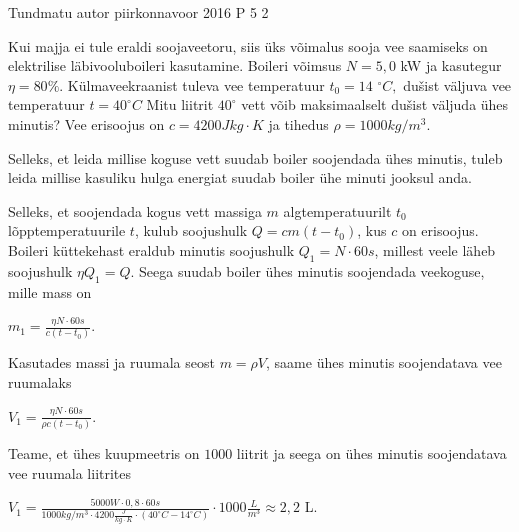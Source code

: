 {Tundmatu autor} %
{piirkonnavoor} %
{2016} %
{P 5} %
{2} %
{

\ifStatement
Kui majja ei tule eraldi soojaveetoru, siis üks võimalus sooja vee saamiseks on elektrilise läbivooluboileri kasutamine. Boileri võimsus $N = 5,0$ kW ja kasutegur $\eta = 80\%$. Külmaveekraanist tuleva vee temperatuur $t_0 = 14$ $^{\circ}C,$ dušist väljuva vee temperatuur $t = 40 ^{\circ}C$ Mitu liitrit $40 ^{\circ}$ vett võib maksimaalselt dušist väljuda ühes minutis? Vee erisoojus on $c = 4200 J kg \cdot K$ ja tihedus $\rho = 1000 kg/m^3$.
\fi

\ifHint
Selleks, et leida millise koguse vett suudab boiler soojendada ühes minutis, tuleb leida millise kasuliku hulga energiat suudab boiler ühe minuti jooksul anda.
\fi


\ifSolution
Selleks, et soojendada kogus vett massiga $m$ algtemperatuurilt $t_0$ lõpptemperatuurile $t$, kulub soojushulk $Q = cm(t - t_0)$, kus $c$ on erisoojus. Boileri küttekehast eraldub minutis soojushulk $Q_1 = N \cdot 60 s$, millest veele läheb soojushulk $\eta Q_1 = Q$. Seega suudab boiler ühes minutis soojendada veekoguse, mille mass on 
\begin{center}
$m_1 = \frac{\eta N \cdot 60 s}{c(t - t_0)}$.
\end{center}
Kasutades massi ja ruumala seost $m = \rho V$, saame ühes minutis soojendatava vee ruumalaks
\begin{center}
$ V_1 = \frac{\eta N \cdot 60 s}{\rho c (t - t_0)}$.
\end{center}
Teame, et ühes kuupmeetris on $1000$ liitrit ja seega on ühes minutis soojendatava vee ruumala liitrites
\begin{center}
$V_1 = \frac{5000 W \cdot 0,8 \cdot 60 s}{1000 kg/m^3 \cdot 4200\frac{J}{kg \cdot K} \cdot (40 ^{\circ} C - 14 ^{\circ}C) } \cdot 1000 \frac{L}{m^3} \approx 2,2$ L.
\end{center}
\fi
}
